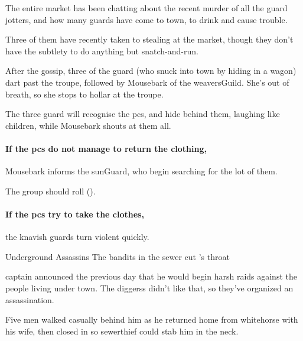 \begin{exampletext}
  The entire market has been chatting about the recent murder of all the \gls{guard} \glspl{jotter}, and how many \glspl{guard} have come to town, to drink and cause trouble.

  Three of them have recently taken to stealing at the market, though they don't have the subtlety to do anything but snatch-and-run.
\end{exampletext}

After the gossip, three of the \gls{guard} (who snuck into town by hiding in a wagon) dart past the troupe, followed by Mousebark of the \gls{weaversGuild}.
She's out of breath, so she stops to hollar at the troupe.

The three \gls{guard} will recognise the \glspl{pc}, and hide behind them, laughing like children, while Mousebark shouts at them all.


\paragraph{If the \glspl{pc} do not manage to return the clothing,}
Mousebark informs the \gls{sunGuard}, who begin searching for the lot of them.

The group should roll  (\tn[8]).

\paragraph{If the \glspl{pc} try to take the clothes,}
the knavish \glspl{guard} turn violent quickly.


{Underground Assassins}%
{The bandits in the sewer cut 's throat}%

\begin{exampletext}
  \Gls{captain} announced the previous day that he would begin harsh raids against the people living under \gls{town}.
  The \glspl{diggers} didn't like that, so they've organized an assassination.

  Five men walked casually behind him as he returned home from \gls{whitehorse} with his wife, then closed in so \gls{sewerthief} could stab him in the neck.
\end{exampletext}

